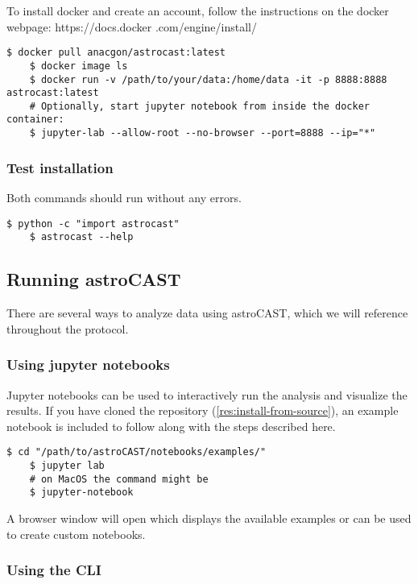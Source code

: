 To install docker and create an account, follow the instructions on the docker webpage: https://docs.docker
.com/engine/install/

\begin{lstlisting}[style=bashStyle]
    $ docker pull anacgon/astrocast:latest
    $ docker image ls
    $ docker run -v /path/to/your/data:/home/data -it -p 8888:8888 astrocast:latest
    # Optionally, start jupyter notebook from inside the docker container:
    $ jupyter-lab --allow-root --no-browser --port=8888 --ip="*"
\end{lstlisting}

\subsubsection{Test installation}

Both commands should run without any errors.

\begin{lstlisting}[style=bashStyle]
    $ python -c "import astrocast"
    $ astrocast --help
\end{lstlisting}

\subsection{Running astroCAST}

There are several ways to analyze data using \ac{astroCAST}, which we will reference throughout the protocol.

\subsubsection{Using jupyter notebooks}

Jupyter notebooks can be used to interactively run the analysis and visualize the results.
If you have cloned the repository (\ref{res:install-from-source}), an example notebook is included to follow along with the steps described here.

\begin{lstlisting}[style=bashStyle]
    $ cd "/path/to/astroCAST/notebooks/examples/"
    $ jupyter lab
    # on MacOS the command might be
    $ jupyter-notebook
\end{lstlisting}

A browser window will open which displays the available examples or can be used to create custom notebooks.

\subsubsection{Using the \ac{CLI}}

